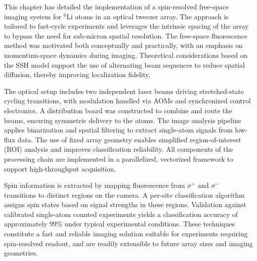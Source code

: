 
This chapter has detailed the implementation of a spin-resolved free-space imaging system for ${}^6$Li atoms in an optical tweezer array. The approach is tailored to fast-cycle experiments and leverages the intrinsic spacing of the array to bypass the need for sub-micron spatial resolution. 
% 
The free-space fluorescence method was motivated both conceptually and practically, with an emphasis on momentum-space dynamics during imaging. Theoretical considerations based on the SSH model support the use of alternating beam sequences to reduce spatial diffusion, thereby improving localization fidelity.

The optical setup includes two independent laser beams driving stretched-state cycling transitions, with modulation handled via AOMs and synchronized control electronics. A distribution board was constructed to combine and route the beams, ensuring symmetric delivery to the atoms. 
% 
The image analysis pipeline applies binarization and spatial filtering to extract single-atom signals from low-flux data. The use of fixed array geometry enables simplified region-of-interest (ROI) analysis and improves classification reliability. All components of the processing chain are implemented in a parallelized, vectorized framework to support high-throughput acquisition.

Spin information is extracted by mapping fluorescence from $\sigma^+$ and $\sigma^-$ transitions to distinct regions on the camera. A per-site classification algorithm assigns spin states based on signal strengths in these regions. Validation against calibrated single-atom counted experiments yields a classification accuracy of approximately 99\% under typical experimental conditions.
% 
These techniques constitute a fast and reliable imaging solution suitable for experiments requiring spin-resolved readout, and are readily extensible to future array sizes and imaging geometries.
